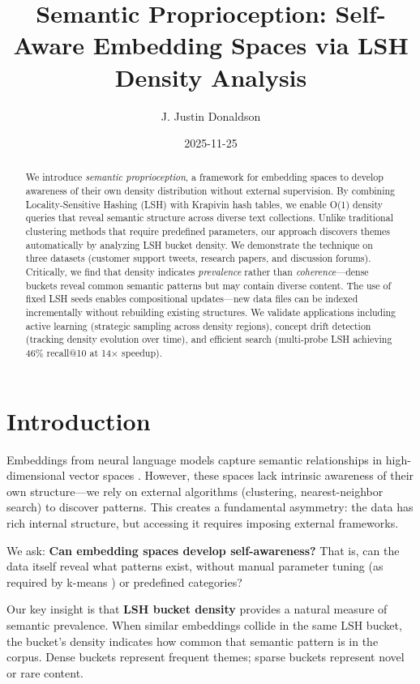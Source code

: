 \documentclass[
]{article}
\title{Semantic Proprioception: Self-Aware Embedding Spaces via LSH
Density Analysis}
\author{J. Justin Donaldson}
\date{2025-11-25}
\begin{document}
\maketitle
\begin{abstract}
We introduce \emph{semantic proprioception}, a framework for embedding
spaces to develop awareness of their own density distribution without
external supervision. By combining Locality-Sensitive Hashing (LSH) with
Krapivin hash tables, we enable O(1) density queries that reveal
semantic structure across diverse text collections. Unlike traditional
clustering methods that require predefined parameters, our approach
discovers themes automatically by analyzing LSH bucket density. We
demonstrate the technique on three datasets (customer support tweets,
research papers, and discussion forums). Critically, we find that
density indicates \emph{prevalence} rather than \emph{coherence}---dense
buckets reveal common semantic patterns but may contain diverse content.
The use of fixed LSH seeds enables compositional updates---new data
files can be indexed incrementally without rebuilding existing
structures. We validate applications including active learning
(strategic sampling across density regions), concept drift detection
(tracking density evolution over time), and efficient search
(multi-probe LSH achieving 46\% recall@10 at 14× speedup).
\end{abstract}


\section{Introduction}\label{introduction}

Embeddings from neural language models capture semantic relationships in
high-dimensional vector spaces
\autocite{devlin2019bert,reimers2019sentence}. However, these spaces
lack intrinsic awareness of their own structure---we rely on external
algorithms (clustering, nearest-neighbor search) to discover patterns.
This creates a fundamental asymmetry: the data has rich internal
structure, but accessing it requires imposing external frameworks.

We ask: \textbf{Can embedding spaces develop self-awareness?} That is,
can the data itself reveal what patterns exist, without manual parameter
tuning (as required by k-means \autocite{macqueen1967some}) or
predefined categories?

Our key insight is that \textbf{LSH bucket density} provides a natural
measure of semantic prevalence. When similar embeddings collide in the
same LSH bucket, the bucket's density indicates how common that semantic
pattern is in the corpus. Dense buckets represent frequent themes;
sparse buckets represent novel or rare content.
\end{document}
